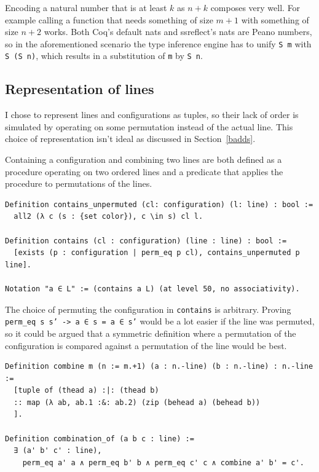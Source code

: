 \documentclass[english, 12pt, a4paper, sci, a-1b, online]{aaltothesis}
\newcommand\icoq[1]{\texttt{#1}}
\begin{document}
Encoding a natural number that is at least $k$ as $n + k$ composes very well. For example calling a function that needs something of size $m + 1$ with something of size $n + 2$ works. Both Coq's default nats and ssreflect's nats are Peano numbers, so in the aforementioned scenario the type inference engine has to unify \icoq{S m} with \icoq{S (S n)}, which results in a substitution of \icoq{m} by \icoq{S n}.

\subsection{Representation of lines}

I chose to represent lines and configurations as tuples, so their lack of order is simulated by operating on some permutation instead of the actual line. This choice of representation isn't ideal as discussed in Section~\ref{badds}.

Containing a configuration and combining two lines are both defined as a procedure operating on two ordered lines and a predicate that applies the procedure to permutations of the lines.

\begin{verbatim}
Definition contains_unpermuted (cl: configuration) (l: line) : bool :=
  all2 (λ c (s : {set color}), c \in s) cl l.

Definition contains (cl : configuration) (line : line) : bool :=
  [exists (p : configuration | perm_eq p cl), contains_unpermuted p line].

Notation "a ∈ L" := (contains a L) (at level 50, no associativity).
\end{verbatim}

The choice of permuting the configuration in \icoq{contains} is arbitrary. Proving \icoq{perm_eq s s' -> a ∈ s = a ∈ s'} would be a lot easier if the line was permuted, so it could be argued that a symmetric definition where a permutation of the configuration is compared against a permutation of the line would be best.

\begin{verbatim}
Definition combine m (n := m.+1) (a : n.-line) (b : n.-line) : n.-line :=
  [tuple of (thead a) :|: (thead b)
  :: map (λ ab, ab.1 :&: ab.2) (zip (behead a) (behead b))
  ].

Definition combination_of (a b c : line) :=
  ∃ (a' b' c' : line),
    perm_eq a' a ∧ perm_eq b' b ∧ perm_eq c' c ∧ combine a' b' = c'.
\end{verbatim}
\end{document}
